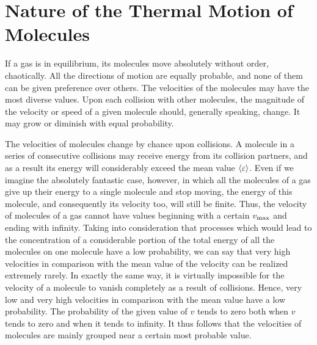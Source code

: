 \section{Nature of the Thermal Motion of Molecules}\label{sec:11_2}

If a gas is in equilibrium, its molecules move absolutely without order, chaotically. All the directions of motion are equally probable, and none of them can be given preference over others. The velocities of the molecules may have the most diverse values. Upon each collision with other molecules, the magnitude of the velocity or speed of a given molecule should, generally speaking, change. It may grow or diminish with equal probability.

The velocities of molecules change by chance upon collisions. A molecule in a series of consecutive collisions may receive energy from its collision partners, and as a result its energy will considerably exceed the mean value $\left\langle \varepsilon \right\rangle$. Even if we imagine the absolutely fantastic case, however, in which all the molecules of a gas give up their energy to a single molecule and stop moving, the energy of this molecule, and consequently its velocity too, will still be finite. Thus, the velocity of molecules of a gas cannot have values beginning with a certain $v_{\text{max}}$ and ending with infinity. Taking into consideration that processes which would lead to the concentration of a considerable portion of the total energy of all the molecules on one molecule have a low probability, we can say that very high velocities in comparison with the mean value of the velocity can be realized extremely rarely. In exactly the same way, it is virtually impossible for the velocity of a molecule to vanish completely as a result of collisions. Hence, very low and very high velocities in comparison with the mean value have a low probability. The probability of the given value of $v$ tends to zero both when $v$ tends to zero and when it tends to infinity. It thus follows that the velocities of molecules are mainly grouped near a certain most probable value.


